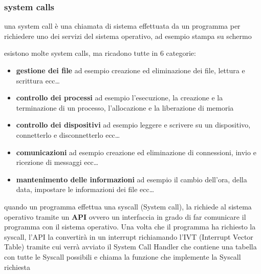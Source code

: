 \documentclass{article}
\begin{document}
    \subsubsection{system calls}
        \label{sec:syscall}
            \begin{tcolorbox}[colback= green!10!white, colframe= green!40!black, title=System Calls]

                una system call è una chiamata di sistema effettuata da un programma per richiedere uno dei servizi del sistema operativo, ad esempio stampa su schermo
            \end{tcolorbox}
        esistono molte system calls, ma ricadono tutte in 6 categorie:
        \begin{itemize}
            \item \textbf{gestione dei file}
            ad esempio creazione ed eliminazione dei file, lettura e scrittura ecc\ldots

            \item \textbf{controllo dei processi}
            ad esempio l'esecuzione, la creazione e la terminazione di un processo, l'allocazione e la liberazione di memoria

            \item \textbf{controllo dei dispositivi}
            ad esempio leggere e scrivere su un dispositivo, connetterlo e disconnetterlo ecc\ldots

            \item \textbf{comunicazioni}
            ad esempio creazione ed eliminazione di connessioni, invio e ricezione di messaggi ecc\ldots
            
            \item \textbf{mantenimento delle informazioni}
            ad esempio il cambio dell'ora, della data, impostare le informazioni dei file ecc\ldots
        \end{itemize}
        quando un programma effettua una syscall (System call), la richiede al sistema operativo tramite un \textbf{API} ovvero un interfaccia in grado di far comunicare il programma con il sistema operativo.
        Una volta che il programma ha richiesto la syscall, l'API la convertirà in un interrupt richiamando l'IVT (Interrupt Vector Table) tramite cui verrà avviato il System Call Handler che contiene una tabella con tutte le Syscall possibili e chiama la funzione che implemente la Syscall richiesta
\end{document}
